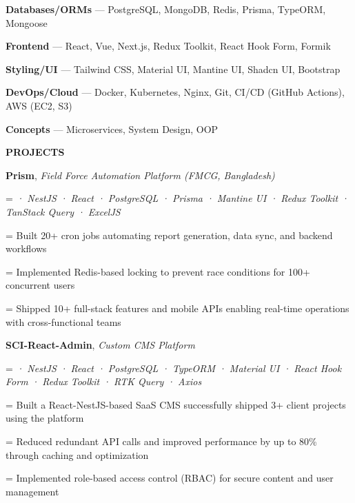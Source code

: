 \documentclass[a4paper]{article}
\newcommand{\sectionfont}{%
  \fontsize{11pt}{13pt}\selectfont\bfseries
}
\newlength{\secondaryindent}
\newlength{\listindent}
\newcommand{\sectiontitle}[1]{%
  \par
  \vspace{8pt}
  {\sectionfont #1}\par
  \vspace{3pt}
}
\newlength{\bulletgap}
\newcommand{\resumebullet}[1]{%
  \begingroup
  \leftskip=\listindent
  \parindent=0pt
  \noindent
  \llap{%
    \raisebox{0.15ex}{%
      \fontsize{7}{7}\selectfont -
    }%
    \hspace{6pt}%
  }%
  #1\par
  \endgroup
  \vspace{\bulletgap}%
}
\newcommand{\secondaryline}[1]{%
  \par
  \begingroup
  \leftskip=\secondaryindent
  \noindent
  #1\par
  \endgroup
}
\newcommand{\projecttitle}[2]{%
  \textbf{#1}, \textit{#2}\par
}
\newcommand{\projecttech}[1]{%
  \secondaryline{\textit{#1}}%
}
\newcommand{\skill}[2]{%
  \textbf{#1} --- #2\par
  \vspace{1pt}%
}
\begin{document}
\skill{Databases/ORMs}{PostgreSQL, MongoDB, Redis, Prisma, TypeORM, Mongoose}

\skill{Frontend}{React, Vue, Next.js, Redux Toolkit, React Hook Form, Formik}

\skill{Styling/UI}{Tailwind CSS, Material UI, Mantine UI, Shadcn UI, Bootstrap}

\skill{DevOps/Cloud}{Docker, Kubernetes, Nginx, Git, CI/CD (GitHub Actions), AWS (EC2, S3)}

\skill{Concepts}{Microservices, System Design, OOP}


\sectiontitle{PROJECTS}

\projecttitle
{Prism}
{Field Force Automation Platform (FMCG, Bangladesh)}

\projecttech{· NestJS · React · PostgreSQL · Prisma · Mantine UI · Redux Toolkit · TanStack Query · ExcelJS}

\vspace{2pt}

\resumebullet{Built 20+ cron jobs automating report generation, data sync, and backend workflows}

\resumebullet{Implemented Redis-based locking to prevent race conditions for 100+ concurrent users}

\resumebullet{Shipped 10+ full-stack features and mobile APIs enabling real-time operations with cross-functional teams}

\vspace{6pt}

\projecttitle
{SCI-React-Admin}
{Custom CMS Platform}

\projecttech{· NestJS · React · PostgreSQL · TypeORM · Material UI · React Hook Form · Redux Toolkit · RTK Query · Axios}

\vspace{2pt}

\resumebullet{Built a React-NestJS-based SaaS CMS successfully shipped 3+ client projects using the platform}

\resumebullet{Reduced redundant API calls and improved performance by up to 80\% through caching and optimization}

\resumebullet{Implemented role-based access control (RBAC) for secure content and user management}

\end{document}
